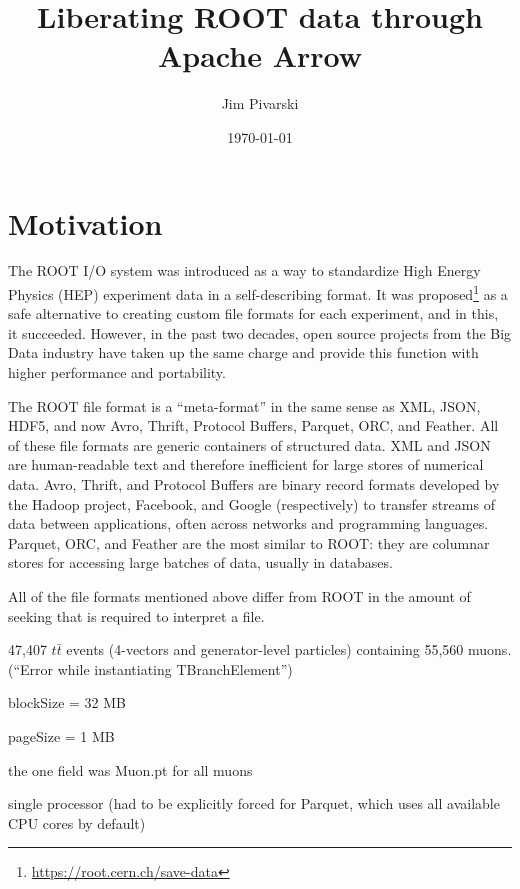 \documentclass{article}
\title{Liberating ROOT data through Apache Arrow}
\author{Jim Pivarski}
\date{\today}
\begin{document}
\maketitle

\section*{Motivation}

The ROOT I/O system was introduced as a way to standardize High Energy Physics (HEP) experiment data in a self-describing format. It was proposed\footnote{\url{https://root.cern.ch/save-data}} as a safe alternative to creating custom file formats for each experiment, and in this, it succeeded. However, in the past two decades, open source projects from the Big Data industry have taken up the same charge and provide this function with higher performance and portability. 

The ROOT file format is a ``meta-format'' in the same sense as XML, JSON, HDF5, and now Avro, Thrift, Protocol Buffers, Parquet, ORC, and Feather. All of these file formats are generic containers of structured data. XML and JSON are human-readable text and therefore inefficient for large stores of numerical data. Avro, Thrift, and Protocol Buffers are binary record formats developed by the Hadoop project, Facebook, and Google (respectively) to transfer streams of data between applications, often across networks and programming languages. Parquet, ORC, and Feather are the most similar to ROOT: they are columnar stores for accessing large batches of data, usually in databases.

All of the file formats mentioned above differ from ROOT in the amount of seeking that is required to interpret a file. 




47,407 $t\bar{t}$ events (4-vectors and generator-level particles) containing 55,560 muons. (``Error while instantiating TBranchElement'')

blockSize = 32 MB

pageSize = 1 MB

the one field was Muon.pt for all muons

single processor (had to be explicitly forced for Parquet, which uses all available CPU cores by default)

\renewcommand{\arraystretch}{1.2}
\end{document}
